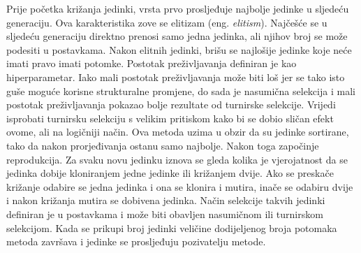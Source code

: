 \documentclass[times, utf8, diplomski, numeric]{fer}
\begin{document}
Prije početka križanja jedinki, vrsta prvo prosljeđuje najbolje jedinke u sljedeću generaciju. Ova karakteristika zove se elitizam (eng. \textit{elitism}). Najčešće se u sljedeću generaciju direktno prenosi samo jedna jedinka, ali njihov broj se može podesiti u postavkama. Nakon elitnih jedinki, brišu se najlošije jedinke koje neće imati pravo imati potomke. Postotak preživljavanja definiran je kao hiperparametar. Iako mali postotak preživljavanja može biti loš jer se tako isto guše moguće korisne strukturalne promjene, do sada je nasumična selekcija i mali postotak preživljavanja pokazao bolje rezultate od turnirske selekcije. Vrijedi isprobati turnirsku selekciju s velikim pritiskom kako bi se dobio sličan efekt ovome, ali na logičniji način. Ova metoda uzima u obzir da su jedinke sortirane, tako da nakon prorjeđivanja ostanu samo najbolje. Nakon toga započinje reprodukcija. Za svaku novu jedinku iznova se gleda kolika je vjerojatnost da se jedinka dobije kloniranjem jedne jedinke ili križanjem dvije. Ako se preskače križanje odabire se jedna jedinka i ona se klonira i mutira, inače se odabiru dvije i nakon križanja mutira se dobivena jedinka. Način selekcije takvih jedinki definiran je u postavkama i može biti obavljen nasumičnom ili turnirskom selekcijom. Kada se prikupi broj jedinki veličine dodijeljenog broja potomaka metoda završava i jedinke se prosljeđuju pozivatelju metode.
\end{document}

